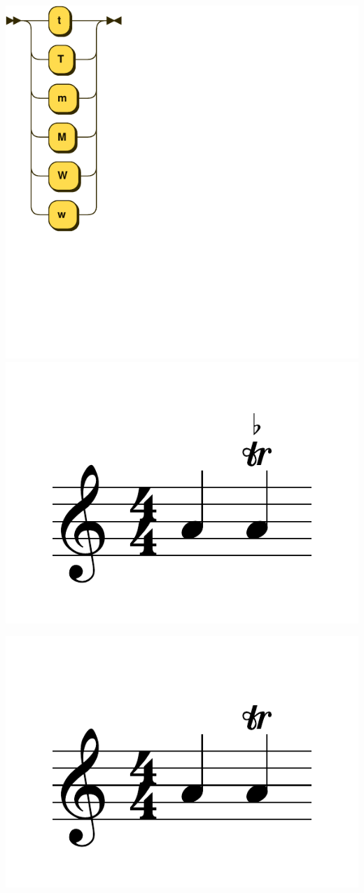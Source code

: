 \documentclass{article}
\begin{document}
\includegraphics[scale=0.5]{figures_railroad/pdf/skern/ornaments.pdf}
\includegraphics[scale=0.5]{figures_tests/pdf/skern/ornaments0.pdf}

\includegraphics[scale=0.5]{figures_tests/pdf/skern/ornaments1.pdf}
\end{document}
